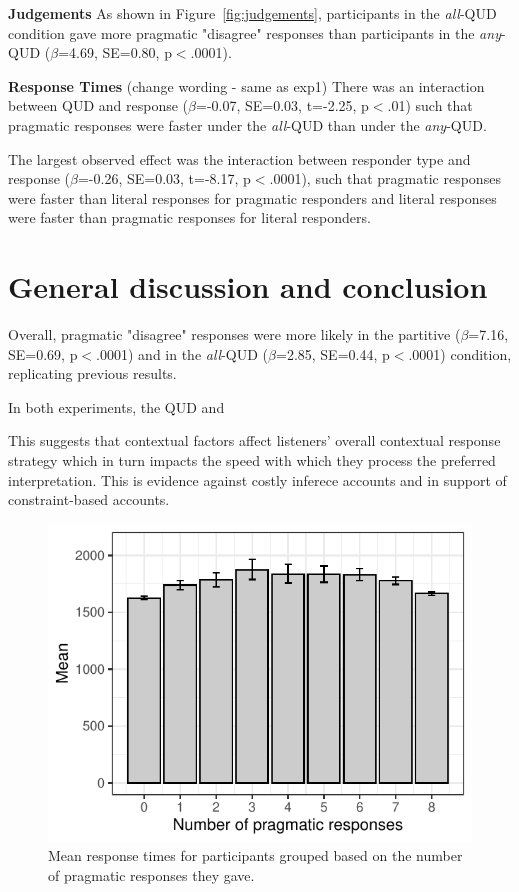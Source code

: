 \documentclass[10pt,letterpaper]{article}
\begin{document}
\noindent \textbf{Judgements}
As shown in Figure~\ref{fig:judgements}, participants in the \textit{all}-QUD condition gave more pragmatic "disagree" responses than participants in the \textit{any}-QUD ($\beta$=4.69, SE=0.80, p$<$.0001). 

\noindent \textbf{Response Times}
(change wording - same as exp1) There was an interaction between QUD and response ($\beta$=-0.07, SE=0.03, t=-2.25, p$<$.01) such that pragmatic responses were faster under the \textit{all}-QUD than under the \textit{any}-QUD. 

The largest observed effect was the interaction between responder type and response ($\beta$=-0.26, SE=0.03, t=-8.17, p$<$.0001), such that pragmatic responses were faster than literal responses for pragmatic responders and literal responses were faster than pragmatic responses for literal responders.


\section{General discussion and conclusion}
Overall, pragmatic "disagree" responses were more likely in the partitive ($\beta$=7.16, SE=0.69, p$<$.0001) and in the \textit{all}-QUD ($\beta$=2.85, SE=0.44, p$<$.0001) condition, replicating previous results.

In both experiments, the QUD and 

This suggests that contextual factors affect listeners' overall contextual response strategy which in turn impacts the speed with which they process the preferred interpretation. This is evidence against costly inferece accounts and in support of constraint-based accounts.

\begin{figure}
  \includegraphics[width=\columnwidth]{plots/consistency.pdf}
  \caption{Mean response times for participants grouped based on the number of pragmatic responses they gave. \label{fig:consistency}}
\end{figure}
\end{document}
